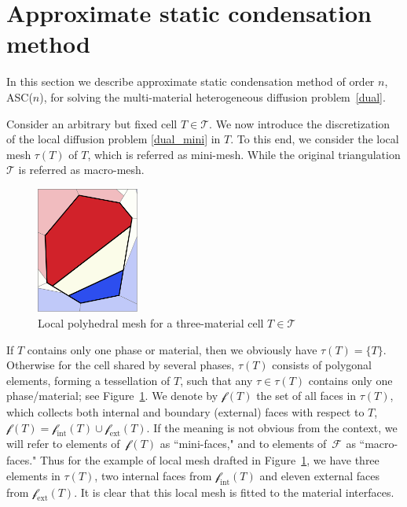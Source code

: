 \documentclass[12pt]{article}
\newcommand{\vect}[1]{\boldsymbol{\mathbf{#1}}}
\newcommand{\bcell}{T}
\newcommand{\bmesh}{{\vect{\mathcal T}}}
\newcommand{\mmesh}{{\vect{\mathcal \tau}}}
\newcommand{\bfaces}[1][]{{\vect{\mathcal F}_{\text{#1}}}}
\newcommand{\mfaces}[1][]{{\vect{\mathcal f}_{\text{#1}}}}
\begin{document}
	\section{Approximate static condensation method} \label{sec:ASC}
	
	In this section we describe  approximate static condensation method of order $n$, ASC($n$), for solving the multi-material heterogeneous diffusion problem~\eqref{dual}.
	
	Consider an arbitrary but fixed cell $T\in\bmesh$. We now introduce the discretization of the local diffusion problem \eqref{dual_mini} in $T$. To this end, we consider the local mesh $\mmesh(T)$ of $T$, which is referred as mini-mesh. While the original triangulation $\bmesh$ is referred as macro-mesh.
	\begin{figure}
		\vspace{-10pt}
		\begin{center}
			\includegraphics[width=0.3\textwidth]{./ring_mini_voronoi_cell.png}%
			\caption{Local polyhedral mesh for a three-material cell $T\in\bmesh$ \label{fig:mmesh}}
		\end{center}
		\vspace{-15pt}
		\vspace{1pt}
	\end{figure}
	If $T$ contains only one phase or material, then we obviously have $\mmesh(T) = \{\bcell\}$. Otherwise for the cell shared by several phases, $\mmesh(T)$ consists of polygonal elements, forming a tessellation of $T$, such that any ${\tau \in \mmesh(T)}$ contains only one phase/material; see Figure~\ref{fig:mmesh}. We denote by $\mfaces(T)$ the set of all faces in $\mmesh(T)$, which collects both   internal and boundary (external) faces with respect to $T$,  $\mfaces(T) = \mfaces[int](T) \cup \mfaces[ext](T)$. {\color{blue}If the meaning is not obvious from the context, we will refer to elements of~$\mfaces(T)$ as ``mini-faces," and to elements of~$\bfaces$ as ``macro-faces."} Thus for the example of local mesh drafted in Figure~\ref{fig:mmesh}, we have three elements in $\mmesh(T)$, two internal faces from $\mfaces[int](T)$ and eleven external faces from $\mfaces[ext](T)$. It is clear that this local mesh is fitted to the material interfaces.
	
\end{document}
